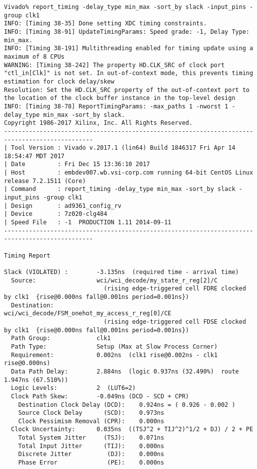 \documentclass{article}
\begin{document}
\begin{lstlisting}
Vivado% report_timing -delay_type min_max -sort_by slack -input_pins -group clk1
INFO: [Timing 38-35] Done setting XDC timing constraints.
INFO: [Timing 38-91] UpdateTimingParams: Speed grade: -1, Delay Type: min_max.
INFO: [Timing 38-191] Multithreading enabled for timing update using a maximum of 8 CPUs
WARNING: [Timing 38-242] The property HD.CLK_SRC of clock port "ctl_in[Clk]" is not set. In out-of-context mode, this prevents timing estimation for clock delay/skew
Resolution: Set the HD.CLK_SRC property of the out-of-context port to the location of the clock buffer instance in the top-level design
INFO: [Timing 38-78] ReportTimingParams: -max_paths 1 -nworst 1 -delay_type min_max -sort_by slack.
Copyright 1986-2017 Xilinx, Inc. All Rights Reserved.
-----------------------------------------------------------------------------------------------
| Tool Version : Vivado v.2017.1 (lin64) Build 1846317 Fri Apr 14 18:54:47 MDT 2017
| Date         : Fri Dec 15 13:36:10 2017
| Host         : embdev007.wb.vsi-corp.com running 64-bit CentOS Linux release 7.2.1511 (Core)
| Command      : report_timing -delay_type min_max -sort_by slack -input_pins -group clk1
| Design       : ad9361_config_rv
| Device       : 7z020-clg484
| Speed File   : -1  PRODUCTION 1.11 2014-09-11
-----------------------------------------------------------------------------------------------

Timing Report

Slack (VIOLATED) :        -3.135ns  (required time - arrival time)
  Source:                 wci/wci_decode/my_state_r_reg[2]/C
                            (rising edge-triggered cell FDRE clocked by clk1  {rise@0.000ns fall@0.001ns period=0.001ns})
  Destination:            wci/wci_decode/FSM_onehot_my_access_r_reg[0]/CE
                            (rising edge-triggered cell FDSE clocked by clk1  {rise@0.000ns fall@0.001ns period=0.001ns})
  Path Group:             clk1
  Path Type:              Setup (Max at Slow Process Corner)
  Requirement:            0.002ns  (clk1 rise@0.002ns - clk1 rise@0.000ns)
  Data Path Delay:        2.884ns  (logic 0.937ns (32.490%)  route 1.947ns (67.510%))
  Logic Levels:           2  (LUT6=2)
  Clock Path Skew:        -0.049ns (DCD - SCD + CPR)
    Destination Clock Delay (DCD):    0.924ns = ( 0.926 - 0.002 ) 
    Source Clock Delay      (SCD):    0.973ns
    Clock Pessimism Removal (CPR):    0.000ns
  Clock Uncertainty:      0.035ns  ((TSJ^2 + TIJ^2)^1/2 + DJ) / 2 + PE
    Total System Jitter     (TSJ):    0.071ns
    Total Input Jitter      (TIJ):    0.000ns
    Discrete Jitter          (DJ):    0.000ns
    Phase Error              (PE):    0.000ns


\end{lstlisting}
\end{document}
